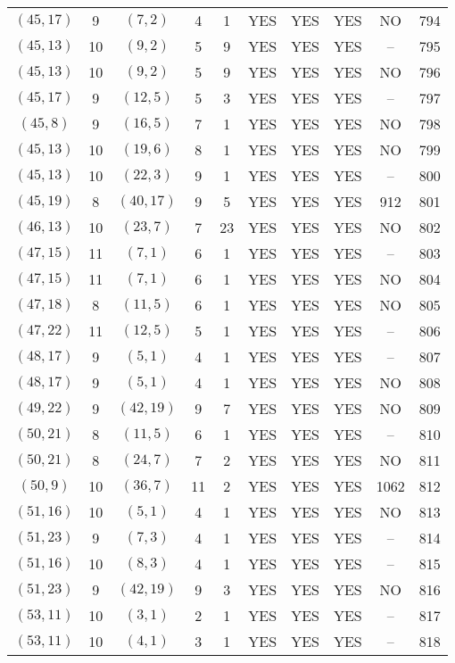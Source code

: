\begin{longtable}{|c|c|c|c|c|c|c|c|c|c|}
$(45, 17)$ & 9 & $(7, 2)$ & 4 & 1 & YES & YES & YES & NO & 794\\
$(45, 13)$ & 10 & $(9, 2)$ & 5 & 9 & YES & YES & YES & -- & 795\\
$(45, 13)$ & 10 & $(9, 2)$ & 5 & 9 & YES & YES & YES & NO & 796\\
$(45, 17)$ & 9 & $(12, 5)$ & 5 & 3 & YES & YES & YES & -- & 797\\
$(45, 8)$ & 9 & $(16, 5)$ & 7 & 1 & YES & YES & YES & NO & 798\\
$(45, 13)$ & 10 & $(19, 6)$ & 8 & 1 & YES & YES & YES & NO & 799\\
$(45, 13)$ & 10 & $(22, 3)$ & 9 & 1 & YES & YES & YES & -- & 800\\
$(45, 19)$ & 8 & $(40, 17)$ & 9 & 5 & YES & YES & YES & 912 & 801\\
$(46, 13)$ & 10 & $(23, 7)$ & 7 & 23 & YES & YES & YES & NO & 802\\
$(47, 15)$ & 11 & $(7, 1)$ & 6 & 1 & YES & YES & YES & -- & 803\\
$(47, 15)$ & 11 & $(7, 1)$ & 6 & 1 & YES & YES & YES & NO & 804\\
$(47, 18)$ & 8 & $(11, 5)$ & 6 & 1 & YES & YES & YES & NO & 805\\
$(47, 22)$ & 11 & $(12, 5)$ & 5 & 1 & YES & YES & YES & -- & 806\\
$(48, 17)$ & 9 & $(5, 1)$ & 4 & 1 & YES & YES & YES & -- & 807\\
$(48, 17)$ & 9 & $(5, 1)$ & 4 & 1 & YES & YES & YES & NO & 808\\
$(49, 22)$ & 9 & $(42, 19)$ & 9 & 7 & YES & YES & YES & NO & 809\\
$(50, 21)$ & 8 & $(11, 5)$ & 6 & 1 & YES & YES & YES & -- & 810\\
$(50, 21)$ & 8 & $(24, 7)$ & 7 & 2 & YES & YES & YES & NO & 811\\
$(50, 9)$ & 10 & $(36, 7)$ & 11 & 2 & YES & YES & YES & 1062 & 812\\
$(51, 16)$ & 10 & $(5, 1)$ & 4 & 1 & YES & YES & YES & NO & 813\\
$(51, 23)$ & 9 & $(7, 3)$ & 4 & 1 & YES & YES & YES & -- & 814\\
$(51, 16)$ & 10 & $(8, 3)$ & 4 & 1 & YES & YES & YES & -- & 815\\
$(51, 23)$ & 9 & $(42, 19)$ & 9 & 3 & YES & YES & YES & NO & 816\\
$(53, 11)$ & 10 & $(3, 1)$ & 2 & 1 & YES & YES & YES & -- & 817\\
$(53, 11)$ & 10 & $(4, 1)$ & 3 & 1 & YES & YES & YES & -- & 818\\

\end{longtable}
